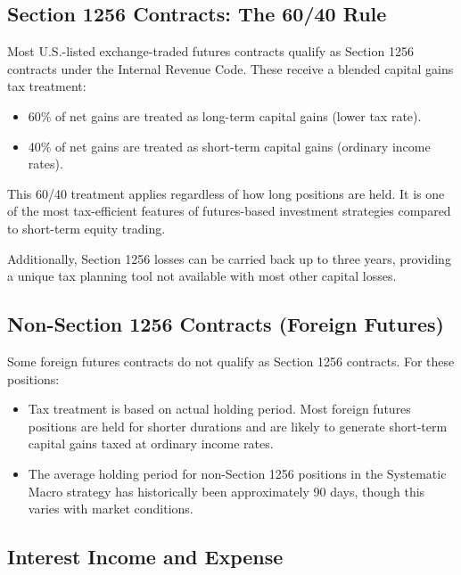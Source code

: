 \documentclass{resolve-whitepaper}
\providecommand{\tightlist}{%
  \setlength{\itemsep}{0pt}\setlength{\parskip}{0pt}}
\begin{document}
\subsection{Section 1256 Contracts: The 60/40
Rule}\label{section-1256-contracts-the-6040-rule}

Most U.S.-listed exchange-traded futures contracts qualify as Section
1256 contracts under the Internal Revenue Code. These receive a blended
capital gains tax treatment:

\begin{itemize}
\tightlist
\item
  60\% of net gains are treated as long-term capital gains (lower tax
  rate).
\item
  40\% of net gains are treated as short-term capital gains (ordinary
  income rates).
\end{itemize}

This 60/40 treatment applies regardless of how long positions are held.
It is one of the most tax-efficient features of futures-based investment
strategies compared to short-term equity trading.

Additionally, Section 1256 losses can be carried back up to three years,
providing a unique tax planning tool not available with most other
capital losses.

\subsection{Non-Section 1256 Contracts (Foreign
Futures)}\label{non-section-1256-contracts-foreign-futures}

Some foreign futures contracts do not qualify as Section 1256 contracts.
For these positions:

\begin{itemize}
\tightlist
\item
  Tax treatment is based on actual holding period. Most foreign futures
  positions are held for shorter durations and are likely to generate
  short-term capital gains taxed at ordinary income rates.
\item
  The average holding period for non-Section 1256 positions in the
  Systematic Macro strategy has historically been approximately 90 days,
  though this varies with market conditions.
\end{itemize}

\subsection{Interest Income and
Expense}\label{interest-income-and-expense}
\end{document}
